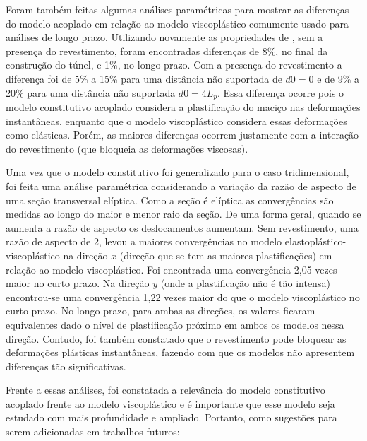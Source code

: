 Foram também feitas algumas análises paramétricas para mostrar as diferenças do modelo acoplado em relação ao modelo viscoplástico comumente usado para análises de longo prazo. Utilizando novamente as propriedades de , sem a presença do revestimento, foram encontradas diferenças de 8\%, no final da construção do túnel, e 1\%, no longo prazo. Com a presença do revestimento a diferença foi de 5\% a 15\% para uma distância não suportada de $d0=0$ e de 9\% a 20\% para uma distância não suportada $d0=4L_p$. Essa diferença ocorre pois o modelo constitutivo acoplado considera a plastificação do maciço nas deformações instantâneas, enquanto que o modelo viscoplástico considera essas deformações como elásticas. Porém, as maiores diferenças ocorrem justamente com a interação do revestimento (que bloqueia as deformações viscosas).

Uma vez que o modelo constitutivo foi generalizado para o caso tridimensional, foi feita uma análise paramétrica considerando a variação da razão de aspecto de uma seção transversal elíptica. Como a seção é elíptica as convergências são medidas ao longo do maior e menor raio da seção. De uma forma geral, quando se aumenta a razão de aspecto os deslocamentos aumentam. Sem revestimento, uma razão de aspecto de 2, levou a maiores convergências no modelo elastoplástico-viscoplástico na direção $x$ (direção que se tem as maiores plastificações) em relação ao modelo viscoplástico. Foi encontrada uma convergência 2,05 vezes maior no curto prazo. Na direção $y$ (onde a plastificação não é tão intensa) encontrou-se uma convergência 1,22 vezes maior do que o modelo viscoplástico no curto prazo. No longo prazo, para ambas as direções, os valores ficaram equivalentes dado o nível de plastificação próximo em ambos os modelos nessa direção. Contudo, foi também constatado que o revestimento pode bloquear as deformações plásticas instantâneas, fazendo com que os modelos não apresentem diferenças tão significativas.

Frente a essas análises, foi constatada a relevância do modelo constitutivo acoplado frente ao modelo viscoplástico e é importante que esse modelo seja estudado com mais profundidade e ampliado. Portanto, como sugestões para serem adicionadas em trabalhos futuros:

